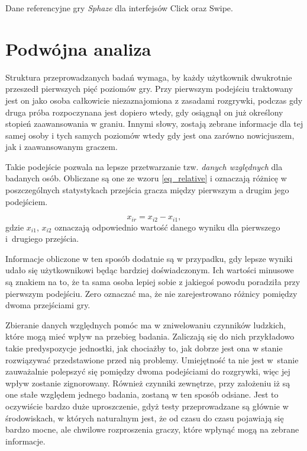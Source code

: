 \documentclass[a4paper,12pt,numbers=noenddot]{report}
\begin{document}
\begin{table}[H]
  \centering
  
  \caption{Dane referencyjne gry \textit{Sphaze} dla interfejsów Click oraz Swipe.}
	
  \label{tab:ref_data}%
\end{table}%

\section{Podwójna analiza}
Struktura przeprowadzanych badań wymaga, by każdy użytkownik dwukrotnie przeszedł pierwszych pięć poziomów gry. Przy pierwszym podejściu traktowany jest on jako osoba całkowicie niezaznajomiona z zasadami rozgrywki, podczas gdy druga próba rozpoczynana jest dopiero wtedy, gdy osiągnął on już określony stopień zaawansowania w graniu. Innymi słowy, zostają zebrane informacje dla tej samej osoby i tych samych poziomów wtedy gdy jest ona zarówno nowicjuszem, jak i zaawansowanym graczem. 

Takie podejście pozwala na lepsze przetwarzanie tzw. \textit{danych względnych} dla badanych osób. Obliczane są one ze wzoru \ref{eq_relative} i oznaczają różnicę w poszczególnych statystykach przejścia gracza między pierwszym a drugim jego podejściem. 

\begin{equation}
\label{eq_relative}
x_{ir} = x_{i2} - x_{i1},
\end{equation}
gdzie $x_{i1}$, $x_{i2}$ oznaczają odpowiednio wartość danego wyniku dla pierwszego i~drugiego przejścia.

Informacje obliczone w ten sposób dodatnie są w przypadku, gdy lepsze wyniki udało się użytkownikowi będąc bardziej doświadczonym. Ich wartości minusowe są znakiem na to, że ta sama osoba lepiej sobie z jakiegoś powodu poradziła przy pierwszym podejściu. Zero oznaczać ma, że nie zarejestrowano różnicy pomiędzy dwoma przejściami gry.

Zbieranie danych względnych pomóc ma w zniwelowaniu czynników ludzkich, które mogą mieć wpływ na przebieg badania. Zaliczają się do nich przykładowo takie predyspozycje jednostki, jak chociażby to, jak dobrze jest ona w stanie rozwiązywać przedstawione przed nią problemy. Umiejętność ta nie jest w~stanie zauważalnie polepszyć się pomiędzy dwoma podejściami do rozgrywki, więc jej wpływ zostanie zignorowany.
Również czynniki zewnętrze, przy założeniu iż są one stałe względem jednego badania, zostaną w ten sposób odsiane. Jest to oczywiście bardzo duże uproszczenie, gdyż testy przeprowadzane są głównie w środowiskach, w których naturalnym jest, że od czasu do czasu pojawiają się bardzo mocne, ale chwilowe rozproszenia graczy, które wpłynąć mogą na zebrane informacje.
\end{document}
